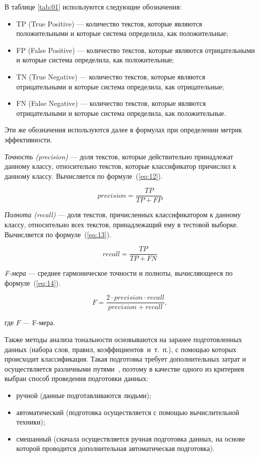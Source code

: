В таблице \ref{tab:01} используются следующие обозначения:
\begin{itemize}
    \item TP (True Positive) --- количество текстов, которые являются
        положительными и которые система определила, как положительные;
    \item FP (False Positive) --- количество текстов, которые являются
        отрицательными и которые система определила, как положительные;
    \item TN (True Negative) --- количество текстов, которые являются
        отрицательными и которые система определила, как отрицательные;
    \item FN (False Negative) --- количество текстов, которые являются
        отрицательными и которые система определила, как положительные.
\end{itemize}

Эти же обозначения используются далее в формулах при определении метрик
эффективности.

\textit{Точность (precision)} --- доля текстов, которые действительно принадлежат данному
классу, относительно текстов, которые классификатор причислил к данному
классу. Вычисляется по формуле~(\ref{eq:12}).

\begin{equation}\label{eq:12}
    precision = \frac{TP}{TP + FP}
\end{equation}

\textit{Полнота (recall)} --- доля текстов, причисленных классификатором к
данному классу, относительно всех текстов, принадлежащий ему в тестовой
выборке. Вычисляется по формуле~(\ref{eq:13}).

\begin{equation}\label{eq:13}
    recall = \frac{TP}{TP + FN}
\end{equation}

\textit{F-мера} --- среднее гармоническое точности и полноты, вычисляющееся
по формуле~(\ref{eq:14}).

\begin{equation}\label{eq:14}
    F = \frac{2 \cdot precision \cdot recall}{precision + recall},
\end{equation}

где $F$ --- F-мера.

Также методы анализа тональности основываются на заранее подготовленных данных
(набора слов, правил, коэффициентов~и~т.~п.), с помощью которых происходит
классификация. Такая подготовка требует дополнительных затрат и осуществляется
различными путями~\cite{article21}, поэтому в качестве одного из критериев
выбран способ проведения подготовки данных:
\begin{itemize}
    \item ручной (данные подготавливаются людьми);
    \item автоматический (подготовка осуществляется с помощью вычислительной
        техники);
    \item смешанный (сначала осуществляется ручная подготовка данных, на основе
        которой проводится дополнительная автоматическая подготовка).
\end{itemize}

